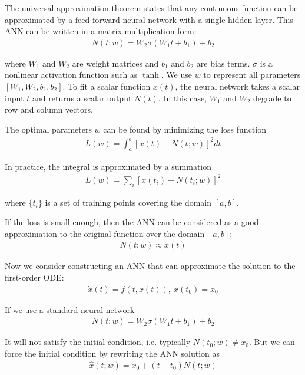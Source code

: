 \documentclass[a4paper]{article}
\numberwithin{equation}{section}
\begin{document}
The universal approximation theorem \cite{hornik89feedforward} states that any continuous function can be approximated by a feed-forward neural network with a single hidden layer. This ANN can be written in a matrix multiplication form:
\begin{align*}
  N(t; w) = W_2 \sigma (W_1 t + b_1) + b_2
\end{align*}

where \(W_1\) and \(W_2\) are weight matrices and \(b_1\) and \(b_2\) are bias terms. \(\sigma\) is a nonlinear activation function such as \(\tanh\). We use \(w\) to represent all parameters \([W_1, W_2, b_1, b_2]\). To fit a scalar function \(x(t)\), the neural network takes a scalar input \(t\) and returns a scalar output \(N(t)\). In this case, \(W_1\) and \(W_2\) degrade to row and column vectors.

The optimal parameters \(w\) can be found by minimizing the loss function
\begin{align*}
  L(w) = \int_a^b {[x(t) - N(t; w)]}^2 dt
\end{align*}

In practice, the integral is approximated by a summation
\begin{align*}
  L(w) = \sum_i {[x(t_i) - N(t_i; w)]}^2
\end{align*}

where \(\{t_i\}\) is a set of training points covering the domain \([a, b]\).

If the loss is small enough, then the ANN can be considered as a good approximation to the original function over the domain \([a, b]\):
\begin{align*}
  N(t; w) \approx x(t)
\end{align*}

Now we consider constructing an ANN that can approximate the solution to the first-order ODE:
\begin{align*}
  \dot{x}(t) = f(t, x(t)),\ x(t_0) = x_0
\end{align*}

If we use a standard neural network
\begin{align*}
  N(t; w) = W_2\sigma(W_1t + b_1) + b_2
\end{align*}

It will not satisfy the initial condition, i.e. typically \(N(t_0; w) \neq x_0\).  But we can force the initial condition by rewriting the ANN solution as
\begin{align*}
  \hat{x}(t; w) = x_0 + (t - t_0)N(t; w)
\end{align*}
\end{document}
